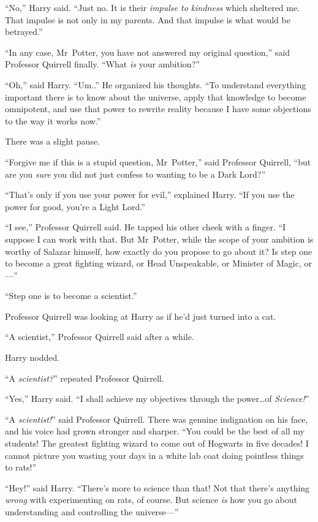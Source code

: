 “No,” Harry said. “Just no. It is their \emph{impulse to kindness} which sheltered me. That impulse is not only in my parents. And that impulse is what would be betrayed.”

“In any case, Mr~Potter, you have not answered my original question,” said Professor Quirrell finally. “What \emph{is} your ambition?”

“Oh,” said Harry. “Um..” He organized his thoughts. “To understand everything important there is to know about the universe, apply that knowledge to become omnipotent, and use that power to rewrite reality because I have some objections to the way it works now.”

There was a slight pause.

“Forgive me if this is a stupid question, Mr~Potter,” said Professor Quirrell, “but are you \emph{sure} you did not just confess to wanting to be a Dark Lord?”

“That’s only if you use your power for evil,” explained Harry. “If you use the power for good, you’re a Light Lord.”

“I see,” Professor Quirrell said. He tapped his other cheek with a finger. “I suppose I can work with that. But Mr~Potter, while the scope of your ambition is worthy of Salazar himself, how exactly do you propose to go about it? Is step one to become a great fighting wizard, or Head Unspeakable, or Minister of Magic, or—”

“Step one is to become a scientist.”

Professor Quirrell was looking at Harry as if he’d just turned into a cat.

“A scientist,” Professor Quirrell said after a while.

Harry nodded.

“A \emph{scientist?}” repeated Professor Quirrell.

“Yes,” Harry said. “I shall achieve my objectives through the power…of \emph{Science!}”

“A \emph{scientist!}” said Professor Quirrell. There was genuine indignation on his face, and his voice had grown stronger and sharper. “You could be the best of all my students! The greatest fighting wizard to come out of Hogwarts in five decades! I cannot picture you wasting your days in a white lab coat doing pointless things to rats!”

“Hey!” said Harry. “There’s more to science than that! Not that there’s anything \emph{wrong} with experimenting on rats, of course. But science \emph{is} how you go about understanding and controlling the universe—”

